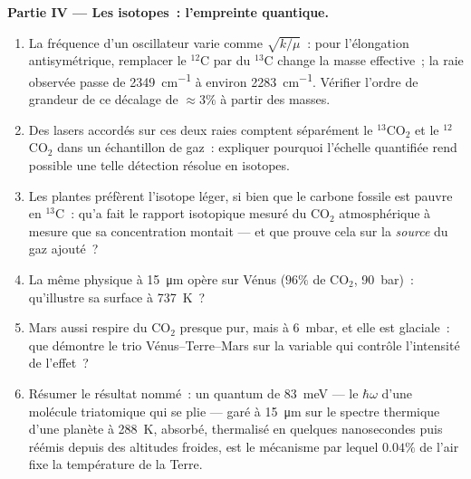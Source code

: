 \begin{problem}
\medskip\noindent\textbf{Partie IV --- Les isotopes~: l'empreinte
quantique.}
\begin{enumerate}[resume]
  \item La fréquence d'un oscillateur varie comme $\sqrt{k/\mu}$~:
        pour l'élongation antisymétrique, remplacer le $^{12}$C par du
        $^{13}$C change la masse effective~; la raie observée passe de
        \qty{2349}{cm^{-1}} à environ \qty{2283}{cm^{-1}}. Vérifier
        l'ordre de grandeur de ce décalage de $\approx 3\%$ à partir
        des masses.
  \item Des lasers accordés sur ces deux raies comptent séparément le
        $^{13}$CO$_2$ et le $^{12}$CO$_2$ dans un échantillon de gaz~:
        expliquer pourquoi l'échelle quantifiée rend possible une telle
        détection résolue en isotopes.
  \item Les plantes préfèrent l'isotope léger, si bien que le carbone
        fossile est pauvre en $^{13}$C~: qu'a fait le rapport
        isotopique mesuré du CO$_2$ atmosphérique à mesure que sa
        concentration montait --- et que prouve cela sur la
        \emph{source} du gaz ajouté~?
  \item La même physique à \qty{15}{\micro m} opère sur Vénus
        ($96\%$ de CO$_2$, \qty{90}{bar})~: qu'illustre sa surface à
        \qty{737}{K}~?
  \item Mars aussi respire du CO$_2$ presque pur, mais à \qty{6}{mbar},
        et elle est glaciale~: que démontre le trio
        Vénus--Terre--Mars sur la variable qui contrôle l'intensité de
        l'effet~?
  \item Résumer le résultat nommé~: un quantum de \qty{83}{meV} ---
        le $\hbar\omega$ d'une molécule triatomique qui se plie ---
        garé à \qty{15}{\micro m} sur le spectre thermique d'une
        planète à \qty{288}{K}, absorbé, thermalisé en quelques
        nanosecondes puis réémis depuis des altitudes froides, est le
        mécanisme par lequel $0.04\%$ de l'air fixe la température de
        la Terre.
\end{enumerate}
\end{problem}
